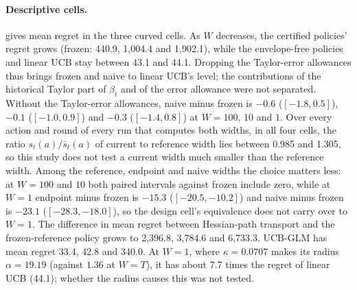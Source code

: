 \paragraph{Descriptive cells.}
 gives mean regret in the three curved
cells. As $W$
decreases, the certified policies' regret grows (frozen: 440.9, 1,004.4 and
1,902.1), while the envelope-free policies and linear UCB stay between 43.1
and 44.1. Dropping the Taylor-error allowances thus brings frozen and naive to
linear UCB's level; the contributions of the historical Taylor part of
$\beta_t$ and of the error allowance were not separated. Without the
Taylor-error allowances, naive minus frozen is $-0.6$ ($[-1.8, 0.5]$), $-0.1$
($[-1.0, 0.9]$) and $-0.3$ ($[-1.4, 0.8]$) at $W=100$, $10$ and $1$. Over every
action and round of every run that computes both widths, in all four cells,
the ratio $s_t(a)/\bar s_t(a)$ of current to reference width lies between
0.985 and 1.305, so this study does not test a current width much smaller than
the reference width. Among the reference, endpoint and naive widths the choice
matters less: at $W=100$ and $10$ both paired intervals against frozen include
zero, while at $W=1$ endpoint minus frozen is $-15.3$ ($[-20.5,-10.2]$) and
naive minus frozen is $-23.1$ ($[-28.3,-18.0]$), so the design cell's
equivalence does not carry over to $W=1$. The difference in mean regret
between Hessian-path transport and the frozen-reference policy grows to 2,396.8, 3,784.6 and 6,733.3. UCB-GLM has mean regret 33.4, 42.8 and
340.0. At $W=1$, where $\kappa=0.0707$ makes its radius $\alpha=19.19$
(against $1.36$ at $W=T$), it has about 7.7 times the regret of linear UCB
(44.1); whether the radius causes this was not tested.


